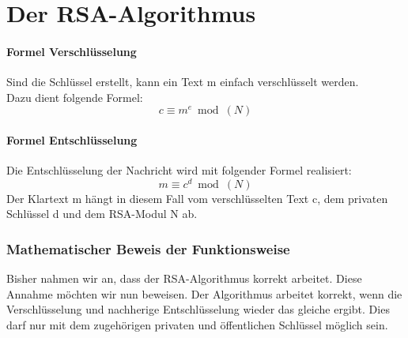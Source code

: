 \newpage
\part{Der RSA-Algorithmus}
%

%

%
\subsection{Formel Verschlüsselung}
Sind die Schlüssel erstellt, kann ein Text m einfach verschlüsselt werden.\\
Dazu dient folgende Formel:
%
\begin{equation}
  c \equiv m^e  \bmod(N)
  \label{eqn:rsa_encription}
\end{equation}
%

\subsection{Formel Entschlüsselung}
Die Entschlüsselung der Nachricht wird mit folgender Formel realisiert:
%
\begin{equation}
  m \equiv c^d \bmod(N)
  \label{eqn:rsa_decription}
\end{equation}
%
Der Klartext m hängt in diesem Fall vom verschlüsselten Text c, dem privaten Schlüssel d und dem RSA-Modul N ab. 
%
%
\newpage
\section{Mathematischer Beweis der Funktionsweise}
Bisher nahmen wir an, dass der RSA-Algorithmus korrekt arbeitet. Diese Annahme möchten wir nun beweisen. Der Algorithmus arbeitet korrekt, wenn die Verschlüsselung und nachherige Entschlüsselung wieder das gleiche ergibt. Dies darf nur mit dem zugehörigen privaten und öffentlichen Schlüssel möglich sein.
%
